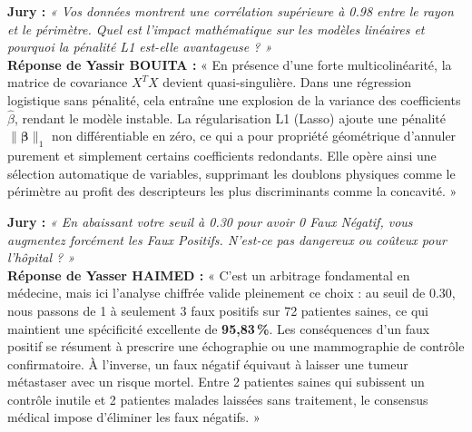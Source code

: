 \documentclass[a4paper,11pt]{article}
\begin{document}
\begin{tcolorbox}[qabox, title={\textbf{Question 2 (Mathématiques \& Régularisation) -- Assignée à Yassir BOUITA}}]
	\textbf{Jury :} \textit{« Vos données montrent une corrélation supérieure à 0.98 entre le rayon et le périmètre. Quel est l'impact mathématique sur les modèles linéaires et pourquoi la pénalité L1 est-elle avantageuse ? »}\\
	\textbf{Réponse de Yassir BOUITA :}
	« En présence d'une forte multicolinéarité, la matrice de covariance $X^T X$ devient quasi-singulière. Dans une régression logistique sans pénalité, cela entraîne une explosion de la variance des coefficients $\hat{\beta}$, rendant le modèle instable. La régularisation L1 (Lasso) ajoute une pénalité $\|\boldsymbol{\beta}\|_1$ non différentiable en zéro, ce qui a pour propriété géométrique d'annuler purement et simplement certains coefficients redondants. Elle opère ainsi une sélection automatique de variables, supprimant les doublons physiques comme le périmètre au profit des descripteurs les plus discriminants comme la concavité. »
\end{tcolorbox}

\begin{tcolorbox}[qabox, title={\textbf{Question 3 (Impact Clinique \& Seuil) -- Assignée à Yasser HAIMED}}]
	\textbf{Jury :} \textit{« En abaissant votre seuil à 0.30 pour avoir 0 Faux Négatif, vous augmentez forcément les Faux Positifs. N'est-ce pas dangereux ou coûteux pour l'hôpital ? »}\\
	\textbf{Réponse de Yasser HAIMED :}
	« C'est un arbitrage fondamental en médecine, mais ici l'analyse chiffrée valide pleinement ce choix : au seuil de 0.30, nous passons de 1 à seulement 3 faux positifs sur 72 patientes saines, ce qui maintient une spécificité excellente de \textbf{95,83\,\%}. Les conséquences d'un faux positif se résument à prescrire une échographie ou une mammographie de contrôle confirmatoire. À l'inverse, un faux négatif équivaut à laisser une tumeur métastaser avec un risque mortel. Entre 2 patientes saines qui subissent un contrôle inutile et 2 patientes malades laissées sans traitement, le consensus médical impose d'éliminer les faux négatifs. »
\end{tcolorbox}
\end{document}
